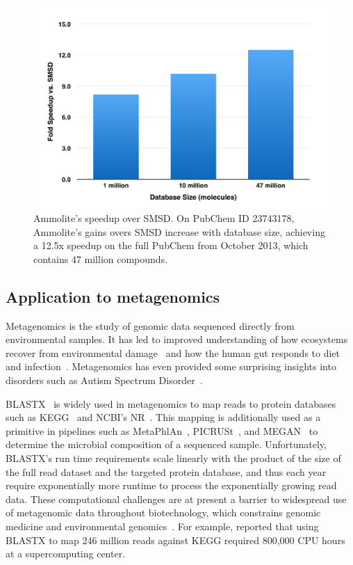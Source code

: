 \documentclass[review,preprint,12pt]{elsarticle}
\renewcommand{\cite}{\citep} %
\theoremstyle{definition}
\theoremstyle{remark}
\numberwithin{equation}{section}
\begin{document}
\begin{figure}[hbp]
    \centering
    \includegraphics[width=1\textwidth]{assets/ammolite-speedup.png}
    \caption{ Ammolite's speedup over SMSD. On PubChem ID 23743178,
    Ammolite's gains overs SMSD increase with database size, achieving a 12.5x
    speedup on the full PubChem from October 2013, which contains 47 million 
    compounds.
    }
    \label{fig:ammoscale}
\end{figure}

\subsection{Application to metagenomics}

Metagenomics is the study of genomic data sequenced directly from environmental
samples.
It has led to improved understanding of how ecosystems recover
from environmental damage~\cite{tyson2004community} and how the human gut responds 
to diet
and infection~\cite{david2014host}.
Metagenomics has even provided some surprising insights into disorders 
such as Autism Spectrum Disorder~\cite{macfabe2012short}.

BLASTX~\cite{altschul1990basic} is widely used in metagenomics to map
reads to protein databases such as KEGG~\cite{kanehisa2000kegg} and NCBI's 
NR~\cite{sayers2011database}.
This mapping is additionally used as a primitive in pipelines such as MetaPhlAn~\cite{segata2012metagenomic}, 
PICRUSt~\cite{langille2013predictive}, and MEGAN~\cite{huson2011integrative} to
determine the microbial composition of a sequenced sample.
Unfortunately, BLASTX's run time requirements scale linearly with the product 
of the size of the full read dataset and the targeted protein database, and 
thus each year require exponentially more runtime to process the exponentially 
growing read data. 
These computational challenges are at present a barrier to widespread use of 
metagenomic data throughout biotechnology, which constrains genomic medicine 
and environmental genomics~\cite{frank2008gastrointestinal}.
For example, \citet{mackelprang2011metagenomic} reported that using BLASTX to map 246
million reads against KEGG required 800,000 CPU hours at a supercomputing 
center.
\end{document}
